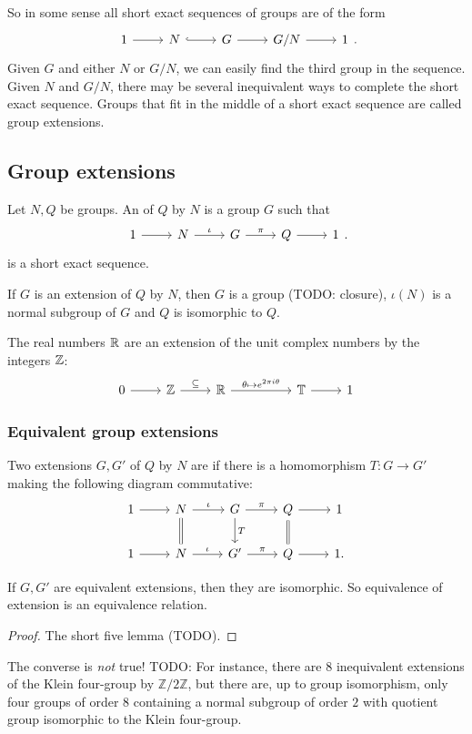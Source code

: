 So in some sense all short exact sequences of groups are of the form
\[ \begin{tikzcd}
1 \rar & N \rar[hookrightarrow] & G \rar & G/N \rar & 1
\end{tikzcd}. \]
Given $G$ and either $N$ or $G/N$, we can easily find the third group in the sequence. Given $N$ and $G/N$, there may be several inequivalent ways to complete the short exact sequence. Groups that fit in the middle of a short exact sequence are called group extensions.

\subsection{Group extensions}
\begin{definition}
Let $N,Q$ be groups. An  of $Q$ by $N$ is a group $G$ such that
\[
\begin{tikzcd}
1 \ar[r] & N \ar[r, "\iota"] & G \ar[r, "\pi"] & Q \ar[r] & 1
\end{tikzcd}.
\]
is a short exact sequence.
\end{definition}
\begin{lemma}
If $G$ is an extension of $Q$ by $N$, then $G$ is a group (TODO: closure), $\iota(N)$ is a normal subgroup of $G$ and $Q$ is isomorphic to $Q$.
\end{lemma}

\begin{example}
The real numbers $\mathbb{R}$ are an extension of the unit complex numbers by the integers $\mathbb{Z}$:
\[ \begin{tikzcd}
0 \rar & \Z \rar{\subseteq} & \R \ar[rr, "\theta\mapsto e^{2\pi i \theta}"] && \T \rar & 1
\end{tikzcd} \]
\end{example}

\subsubsection{Equivalent group extensions}
\begin{definition}
Two extensions $G,G'$ of $Q$ by $N$ are  if there is a homomorphism $T:G\to G'$ making the following diagram commutative:
\[
\begin{tikzcd}
1 \ar[r] & N \ar[r, "\iota"] \ar[equal]{d} & G \ar[r, "\pi"] \ar[d,"T"] & Q \ar[r] \ar[d, equal] & 1 \\
1 \ar[r] & N \ar[r, "\iota"] & G' \ar[r, "\pi"] & Q \ar[r] & 1.
\end{tikzcd}
\]
\end{definition}
\begin{lemma}
If $G,G'$ are equivalent extensions, then they are isomorphic. So equivalence of extension is an equivalence relation.
\end{lemma}
\begin{proof}
The short five lemma (TODO).
\end{proof}
The converse is \emph{not} true! TODO: For instance, there are $8$ inequivalent extensions of the Klein four-group by $\mathbb{Z}/2\mathbb{Z}$, but there are, up to group isomorphism, only four groups of order $8$ containing a normal subgroup of order $2$ with quotient group isomorphic to the Klein four-group.


